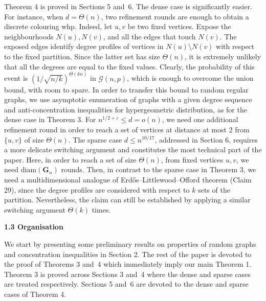 Theorem 4 is proved in Sections 5 and 6. The dense case is significantly easier. For instance, when $d=\Theta(n)$, two refinement rounds are enough to obtain a discrete colouring whp. Indeed, let $u,v$ be two fixed vertices. Expose the neighbourhoods $N(u),N(v)$, and all the edges that touch $N(v)$. The exposed edges identify degree profiles of vertices in $N(u)\setminus N(v)$ with respect to the fixed partition. Since the latter set has size $\Theta(n)$, it is extremely unlikely that all the degrees are equal to the fixed values. Clearly, the probability of this event is $\left(1/\sqrt{n/k}\right)^{\Theta(kn)}$ in $\mathcal{G}(n,p)$, which is enough to overcome the union bound, with room to spare. In order to transfer this bound to random regular graphs, we use asymptotic enumeration of graphs with a given degree sequence and anti-concentration inequalities for hypergeometric distribution, as for the dense case in Theorem 3. For $n^{1/2+\varepsilon}\leq d=o(n)$, we need one additional refinement round in order to reach a set of vertices at distance at most 2 from $\{u,v\}$ of size $\Theta(n)$. The sparse case $d\leq n^{10/17}$, addressed in Section 6, requires a more delicate switching argument and constitutes the most technical part of the paper. Here, in order to reach a set of size $\Theta(n)$, from fixed vertices $u,v$, we need $\mathrm{diam}(\mathbf{G}_{n})$ rounds. Then, in contrast to the sparse case in Theorem 3, we need a multidimensional analogue of Erdős–Littlewood–Offord theorem (Claim 29), since the degree profiles are considered with respect to $k$ sets of the partition. Nevertheless, the claim can still be established by applying a similar switching argument $\Theta(k)$ times.\par





\par\medskip\noindent\textbf{
1.3 Organisation}\par




We start by presenting some preliminary results on properties of random graphs and concentration inequalities in Section 2. The rest of the paper is devoted to the proof of Theorems 3 and 4 which immediately imply our main Theorem 1. Theorem 3 is proved across Sections 3 and 4 where the dense and sparse cases are treated respectively. Sections 5 and 6 are devoted to the dense and sparse cases of Theorem 4.\par





